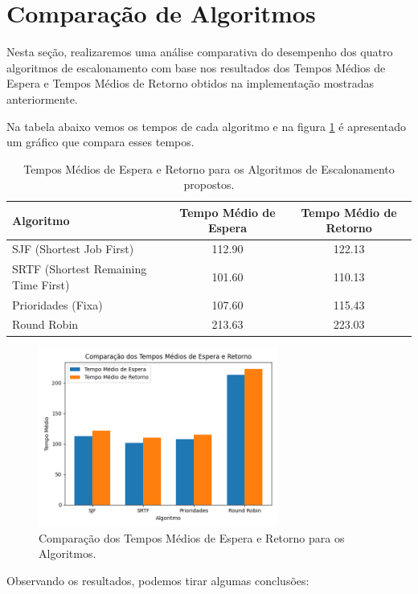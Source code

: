 \documentclass[
	12pt,				%
	openright,			%
	oneside,			%
	a4paper,			%
	chapter=TITLE,		%
	english,			%
	french,				%
	spanish,			%
	brazil				%
	]{abntex2}
\theoremstyle{definition}
\begin{document}
\section{Comparação de Algoritmos}
Nesta seção, realizaremos uma análise comparativa do desempenho dos quatro algoritmos de escalonamento 
com base nos resultados dos Tempos Médios de Espera e Tempos Médios de Retorno obtidos na implementação 
mostradas anteriormente.

Na tabela abaixo vemos os tempos de cada algoritmo e na figura \ref{fig:graf} é apresentado um
gráfico que compara esses tempos.


\begin{table}[ht]
    \centering
    \begin{tabular}{|l|c|c|}
    \hline
    \textbf{Algoritmo} & \textbf{Tempo Médio de Espera} & \textbf{Tempo Médio de Retorno} \\
    \hline
    SJF (Shortest Job First) & 112.90 & 122.13 \\
    SRTF (Shortest Remaining Time First) & 101.60 & 110.13 \\
    Prioridades (Fixa) & 107.60 & 115.43 \\
    Round Robin & 213.63 & 223.03 \\
    \hline
    \end{tabular}
    \caption{Tempos Médios de Espera e Retorno para os Algoritmos de Escalonamento propostos.}
\end{table}

\begin{figure}[H]
        \centering
        \includegraphics[width=0.7\textwidth]{imagens/grafico_bench.png}
        \caption{Comparação dos Tempos Médios de Espera e Retorno para os Algoritmos.}
        \label{fig:graf}
\end{figure}

Observando os resultados, podemos tirar algumas conclusões:
\end{document}
